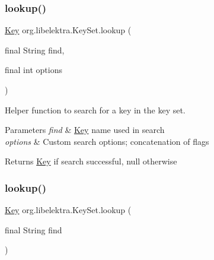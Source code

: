 \subsubsection{\texorpdfstring{lookup()}{lookup()}\hspace{0.1cm}{\footnotesize\ttfamily [3/4]}}
{\footnotesize\ttfamily \hyperlink{classorg_1_1libelektra_1_1Key}{Key} org.\+libelektra.\+Key\+Set.\+lookup (\begin{DoxyParamCaption}\item[{final String}]{find,  }\item[{final int}]{options }\end{DoxyParamCaption})\hspace{0.3cm}{\ttfamily [inline]}}



Helper function to search for a key in the key set. 


\begin{DoxyParams}{Parameters}
{\em find} & \hyperlink{classorg_1_1libelektra_1_1Key}{Key} name used in search \\
\hline
{\em options} & Custom search options; concatenation of flags \\
\hline
\end{DoxyParams}
\begin{DoxyReturn}{Returns}
\hyperlink{classorg_1_1libelektra_1_1Key}{Key} if search successful, null otherwise 
\end{DoxyReturn}
\mbox{\label{classorg_1_1libelektra_1_1KeySet_a69921726091c9a775bb8ece1f1e3a858}} 
\subsubsection{\texorpdfstring{lookup()}{lookup()}\hspace{0.1cm}{\footnotesize\ttfamily [4/4]}}
{\footnotesize\ttfamily \hyperlink{classorg_1_1libelektra_1_1Key}{Key} org.\+libelektra.\+Key\+Set.\+lookup (\begin{DoxyParamCaption}\item[{final String}]{find }\end{DoxyParamCaption})\hspace{0.3cm}{\ttfamily [inline]}}




